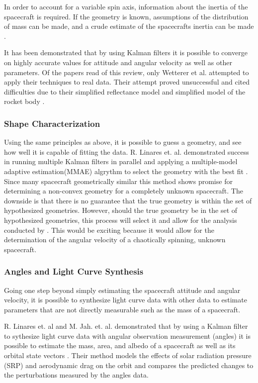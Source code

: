 \documentclass{article}
\begin{document}
In order to account for a variable spin axis, information about the inertia of the spacecraft is required. If the geometry is known, assumptions of the distribution of mass can be made, and a crude estimate of the spacecrafts inertia can be made \cite{LINARES20141}.

It has been demonstrated that by using Kalman filters it is possible to converge on highly accurate values for attitude and angular velocity as well as other parameters. Of the papers read of this review, only Wetterer et al. attempted to apply their techniques to real data. Their attempt proved unsuccessful and cited difficulties due to their simplified reflectance model and simplified model of the rocket body \cite{AttitudeEstimationFromLightCurve}.


\subsubsection{Shape Characterization}

Using the same principles as above, it is possible to guess a geometry, and see how well it is capable of fitting the data. R. Linares et. al. demonstrated success in running multiple Kalman filters in parallel and applying a multiple-model adaptive estimation(MMAE) algrythm to select the geometry with the best fit \cite{SpaceObjectCharacterization}. Since many spacecraft geometrically similar this method shows promise for determining a non-convex geometry for a completely unknown spacecraft. The downside is that there is no guarantee that the true geometry is within the set of hypothesized geometries. However, should the true geometry be in the set of hypothesized geometries, this process will select it and allow for the analysis conducted by \cite{AttitudeEstimationFromLightCurve}. This would be exciting because it would allow for the determination of the angular velocity of a chaotically spinning, unknown spacecraft.

\subsubsection{Angles and Light Curve Synthesis}

Going one step beyond simply estimating the spacecraft attitude and angular velocity, it is possible to synthesize light curve data with other data to estimate parameters that are not directly measurable such as the mass of a spacecraft.

R. Linares et. al  and M. Jah. et. al. demonstrated that by using a Kalman filter to sythesize light curve data with angular observation measurement (angles) it is possible to estimate the mass, area, and albedo of a spacecraft \cite{LINARES20141} as well as its orbital state vectors \cite{StateAndParameter}. Their method models the effects of solar radiation pressure (SRP) and aerodynamic drag on the orbit and compares the predicted changes to the perturbations measured by the angles data. 
\end{document}
